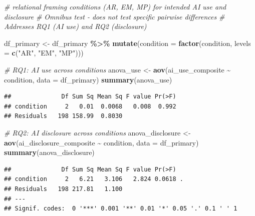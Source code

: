 \documentclass[
]{article}
\newenvironment{Shaded}{\begin{snugshade}}{\end{snugshade}}
\newcommand{\AttributeTok}[1]{\textcolor[rgb]{0.13,0.29,0.53}{#1}}
\newcommand{\CommentTok}[1]{\textcolor[rgb]{0.56,0.35,0.01}{\textit{#1}}}
\newcommand{\FunctionTok}[1]{\textcolor[rgb]{0.13,0.29,0.53}{\textbf{#1}}}
\newcommand{\NormalTok}[1]{#1}
\newcommand{\OtherTok}[1]{\textcolor[rgb]{0.56,0.35,0.01}{#1}}
\newcommand{\SpecialCharTok}[1]{\textcolor[rgb]{0.81,0.36,0.00}{\textbf{#1}}}
\newcommand{\StringTok}[1]{\textcolor[rgb]{0.31,0.60,0.02}{#1}}
\begin{document}
\begin{Shaded}
\begin{Highlighting}[]
\CommentTok{\# relational framing conditions (AR, EM, MP) for intended AI use and disclosure}
\CommentTok{\# Omnibus test {-} does not test specific pairwise differences}
\CommentTok{\# Addresses RQ1 (AI use) and RQ2 (disclosure)}

\NormalTok{df\_primary }\OtherTok{\textless{}{-}}\NormalTok{ df\_primary }\SpecialCharTok{\%\textgreater{}\%}
  \FunctionTok{mutate}\NormalTok{(}\AttributeTok{condition =} \FunctionTok{factor}\NormalTok{(condition, }\AttributeTok{levels =} \FunctionTok{c}\NormalTok{(}\StringTok{"AR"}\NormalTok{, }\StringTok{"EM"}\NormalTok{, }\StringTok{"MP"}\NormalTok{)))}

\CommentTok{\# RQ1: AI use across conditions}
\NormalTok{anova\_use }\OtherTok{\textless{}{-}} \FunctionTok{aov}\NormalTok{(ai\_use\_composite }\SpecialCharTok{\textasciitilde{}}\NormalTok{ condition, }\AttributeTok{data =}\NormalTok{ df\_primary)}
\FunctionTok{summary}\NormalTok{(anova\_use)}
\end{Highlighting}
\end{Shaded}

\begin{verbatim}
##              Df Sum Sq Mean Sq F value Pr(>F)
## condition     2   0.01  0.0068   0.008  0.992
## Residuals   198 158.99  0.8030
\end{verbatim}

\begin{Shaded}
\begin{Highlighting}[]
\CommentTok{\# RQ2: AI disclosure across conditions}
\NormalTok{anova\_disclosure }\OtherTok{\textless{}{-}} \FunctionTok{aov}\NormalTok{(ai\_disclosure\_composite }\SpecialCharTok{\textasciitilde{}}\NormalTok{ condition, }\AttributeTok{data =}\NormalTok{ df\_primary)}
\FunctionTok{summary}\NormalTok{(anova\_disclosure)}
\end{Highlighting}
\end{Shaded}

\begin{verbatim}
##              Df Sum Sq Mean Sq F value Pr(>F)  
## condition     2   6.21   3.106   2.824 0.0618 .
## Residuals   198 217.81   1.100                 
## ---
## Signif. codes:  0 '***' 0.001 '**' 0.01 '*' 0.05 '.' 0.1 ' ' 1
\end{verbatim}
\end{document}
